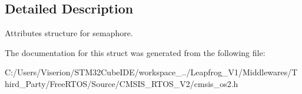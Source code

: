 \subsection{Detailed Description}
Attributes structure for semaphore. 

The documentation for this struct was generated from the following file\+:\begin{DoxyCompactItemize}
\item 
C\+:/\+Users/\+Viserion/\+S\+T\+M32\+Cube\+I\+D\+E/workspace\+\_../\+Leapfrog\+\_\+\+V1/\+Middlewares/\+Third\+\_\+\+Party/\+Free\+R\+T\+O\+S/\+Source/\+C\+M\+S\+I\+S\+\_\+\+R\+T\+O\+S\+\_\+\+V2/cmsis\+\_\+os2.\+h\end{DoxyCompactItemize}

